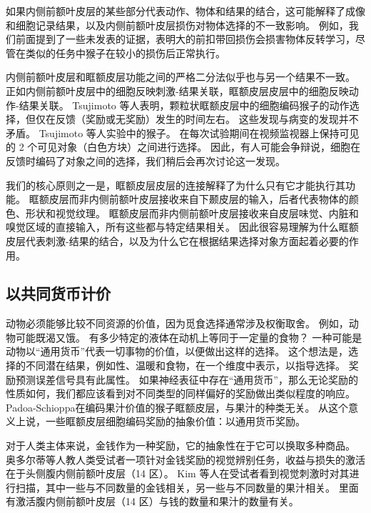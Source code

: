 如果内侧前额叶皮层的某些部分代表动作、物体和结果的结合，这可能解释了成像和细胞记录结果，以及内侧前额叶皮层损伤对物体选择的不一致影响。
例如，我们前面提到了一些未发表的证据，表明大的前扣带回损伤会损害物体反转学习\cite{murray2006prospective}，尽管在类似的任务中猴子在较小的损伤后正常执行\cite{rudebeck2006separate}。\par


内侧前额叶皮层和眶额皮层功能之间的严格二分法似乎也与另一个结果不一致。
正如内侧前额叶皮层中的细胞反映刺激-结果关联\cite{kennerley2009evaluating}，眶额皮层皮层中的细胞反映动作-结果关联。
Tsujimoto 等人\cite{tsujimoto2009monkey}表明，颗粒状眶额皮层中的细胞编码猴子的动作选择，但仅在反馈（奖励或无奖励）发生的时间左右。
这些发现与病变的发现并不矛盾。
Tsujimoto 等人实验中的猴子。
在每次试验期间在视频监视器上保持可见的 2 个可见对象（白色方块）之间进行选择。
因此，有人可能会争辩说，细胞在反馈时编码了对象之间的选择，我们稍后会再次讨论这一发现。\par


我们的核心原则之一是，眶额皮层皮层的连接解释了为什么只有它才能执行其功能。
眶额皮层而非内侧前额叶皮层接收来自下颞皮层的输入，后者代表物体的颜色、形状和视觉纹理。
眶额皮层而非内侧前额叶皮层接收来自皮层味觉、内脏和嗅觉区域的直接输入，所有这些都与特定结果相关。
因此很容易理解为什么眶额皮层代表刺激-结果的结合，以及为什么它在根据结果选择对象方面起着必要的作用。\par



\subsection{以共同货币计价}

动物必须能够比较不同资源的价值，因为觅食选择通常涉及权衡取舍。
例如，动物可能既渴又饿。
有多少特定的液体在动机上等同于一定量的食物？ 
一种可能是动物以“通用货币”代表一切事物的价值，以便做出这样的选择。
这个想法是，选择的不同潜在结果，例如性、温暖和食物，在一个维度中表示，以指导选择\cite{montague2002neural}。
奖励预测误差信号具有此属性。
如果神经表征中存在“通用货币”，那么无论奖励的性质如何，我们都应该看到对不同类型的同样偏好的奖励做出类似程度的响应。
Padoa-Schioppa\cite{padoa2006neurons}在编码果汁价值的猴子眶额皮层，与果汁的种类无关。
从这个意义上说，一些眶额皮层细胞编码奖励的抽象价值：以通用货币奖励。\par


对于人类主体来说，金钱作为一种奖励，它的抽象性在于它可以换取多种商品。
奥多尔蒂等人\cite{o2001abstract}教人类受试者一项针对金钱奖励的视觉辨别任务，收益与损失的激活在于头侧腹内侧前额叶皮层（14 区）。
Kim 等人\cite{kim2011overlapping}在受试者看到视觉刺激时对其进行扫描，其中一些与不同数量的金钱相关，另一些与不同数量的果汁相关。
里面有激活腹内侧前额叶皮层（14 区）与钱的数量和果汁的数量有关。\par


